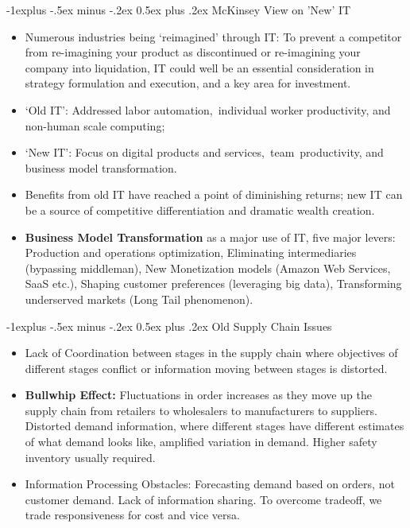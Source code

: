\documentclass[12pt, landscape]{article}
\makeatletter
\renewcommand{\subsection}{\@startsection{subsection}{2}{0mm}%
                                {-1explus -.5ex minus -.2ex}%
                                {0.5ex plus .2ex}%
                                {\normalfont\normalsize\bfseries}}
\makeatother
\begin{document}
\begin{multicols*}{3}
\subsection{McKinsey View on 'New' IT}
\begin{itemize}
\item Numerous industries being `reimagined' through IT: To prevent a competitor from re-imagining your product as discontinued or re-imagining your company into liquidation, IT could well be an essential consideration in strategy formulation and execution, and a key area for investment.
\item `Old IT': Addressed labor automation, individual worker productivity, and non-human scale computing;
\item `New IT': Focus on digital products and services, team productivity, and business model transformation.
\item Benefits from old IT have reached a point of diminishing returns; new IT can be a source of competitive differentiation and dramatic wealth creation.
\item \textbf{Business Model Transformation} as a major use of IT, five major levers: Production and operations optimization, Eliminating intermediaries (bypassing middleman), New Monetization models (Amazon Web Services, SaaS etc.), Shaping customer preferences (leveraging big data), Transforming underserved markets (Long Tail phenomenon).
\end{itemize}

\subsection{Old Supply Chain Issues}
\begin{itemize}
\item Lack of Coordination between stages in the supply chain where objectives of different stages conflict or information moving between stages is distorted.
\item \textbf{Bullwhip Effect:} Fluctuations in order increases as they move up the supply chain from retailers to wholesalers to manufacturers to suppliers. Distorted demand information, where different stages have different estimates of what demand looks like, amplified variation in demand. Higher safety inventory usually required.
\item Information Processing Obstacles: Forecasting demand based on orders, not customer demand. Lack of information sharing. To overcome tradeoff, we trade responsiveness for cost and vice versa.
\end{itemize}


\end{multicols*}
\end{document}
